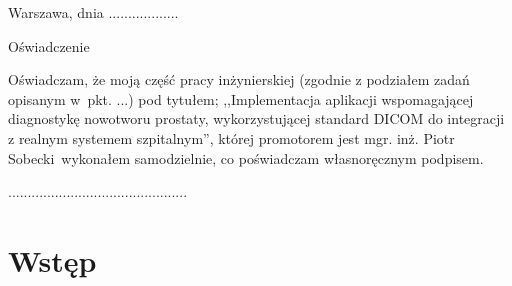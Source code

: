 \documentclass[a4paper,11pt,twoside]{report}
\theoremstyle{definition}
\newcommand{\tytul}{Implementacja aplikacji wspomagającej diagnostykę nowotworu prostaty, wykorzystującej standard DICOM do integracji z realnym systemem szpitalnym}
\newcommand{\type}{inżyniers} %
\newcommand{\supervisor}{mgr. inż. Piotr Sobecki}
\begin{document}
\null\thispagestyle{empty}\newpage

\null \hfill Warszawa, dnia ..................\\

\par\vspace{5cm}

\begin{center}
Oświadczenie %
\end{center}

\indent Oświadczam, że moją część pracy \type kiej (zgodnie z podziałem zadań opisanym w~pkt. ...) pod tytułem; ,,\tytul '', której promotorem jest \supervisor \ wykonałem samodzielnie, co poświadczam własnoręcznym podpisem.
\vspace{2cm}


\begin{flushright}
  \begin{minipage}{50mm}
    \begin{center}
      ..............................................

    \end{center}
  \end{minipage}
\end{flushright}

\thispagestyle{empty}
\newpage

\null\thispagestyle{empty}\newpage

\thispagestyle{empty}
\tableofcontents
\thispagestyle{empty}
\newpage
\setcounter{page}{11}
\pagestyle{fancy}

\chapter{Wstęp} %
\end{document}

